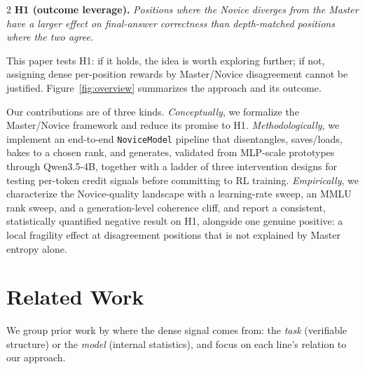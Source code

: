 \documentclass[9pt]{article}
\begin{document}
\begin{multicols}{2}
\medskip
\noindent\textbf{H1 (outcome leverage).} \emph{Positions where the Novice
diverges from the Master have a larger effect on final-answer
correctness than depth-matched positions where the two agree.}
\medskip

\noindent This paper tests H1: if it holds, the idea is worth exploring
further; if not, assigning dense per-position rewards by Master/Novice
disagreement cannot be justified. Figure~\ref{fig:overview} summarizes the
approach and its outcome.

Our contributions are of three kinds. \emph{Conceptually}, we formalize the
Master/Novice framework and reduce its promise to H1.
\emph{Methodologically}, we implement an end-to-end \texttt{NoviceModel}
pipeline that disentangles, saves/loads, bakes to a chosen rank, and
generates, validated from MLP-scale prototypes through Qwen3.5-4B, together
with a ladder of three intervention designs for testing per-token credit
signals before committing to RL training. \emph{Empirically}, we characterize
the Novice-quality landscape with a learning-rate sweep, an MMLU rank sweep,
and a generation-level coherence cliff, and report a consistent,
statistically quantified negative result on H1, alongside one genuine
positive: a local fragility effect at disagreement positions that is not
explained by Master entropy alone.

\section{Related Work}\label{sec:related}

We group prior work by where the dense signal comes from: the \emph{task}
(verifiable structure) or the \emph{model} (internal statistics), and focus on
each line's relation to our approach.


\end{multicols}
\end{document}
